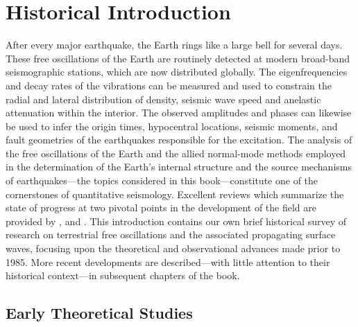 \chapter{Historical Introduction}
\setcounter{page}{3}

After every major earthquake, the Earth rings like a large bell
for several days.  These free oscillations of the Earth
are routinely detected at modern broad-band seismographic stations,
which are now distributed globally. The eigenfrequencies and decay
rates of the vibrations can be measured and used to constrain the
radial and lateral distribution of density, seismic wave speed and
anelastic attenuation within the interior.  The observed amplitudes and phases
can likewise be used to infer the origin times, hypocentral locations,
seismic moments, and fault geometries of the earthquakes responsible
for the excitation.
The analysis of the free oscillations of the Earth and the allied
normal-mode methods employed in the determination of the Earth's internal
structure and the source mechanisms of earthquakes---the topics considered
in this book---constitute one of the cornerstones of quantitative seismology.
Excellent reviews which summarize the state of progress at two pivotal
points in the development of the field are provided by
\textcite{stoneley61}, \textcite{lapwood&usami81} and \textcite{buland81}.
This introduction contains our own brief historical
survey of research on terrestrial free oscillations
and the associated propagating surface waves,
focusing upon the
theoretical and observational advances made prior to 1985.
More recent developments are described---with little attention
to their historical context---in subsequent chapters of the book.

\section{Early Theoretical Studies}

